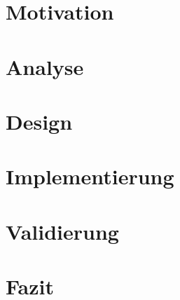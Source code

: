 \documentclass[oneside,bibliography=totoc,openany,numbers=noenddot]{scrbook}
\begin{document}




\startcontents
\chapter{Motivation}
\label{chapter:Motivation}
\thispagestyle{fancy}
 
\stopcontents

\startcontents
\chapter{Analyse}
\label{chapter:Analyse}
\thispagestyle{fancy}

\stopcontents

\startcontents
\chapter{Design}
\label{chapter:Design}
\thispagestyle{fancy}

\stopcontents

\startcontents
\chapter{Implementierung}
\label{chapter:Implementierung}
\thispagestyle{fancy}

\stopcontents

\startcontents
\chapter{Validierung}
\label{chapter:Validierung}
\thispagestyle{fancy}

\stopcontents

\startcontents
\chapter{Fazit}
\label{chapter:Ausblick}
\thispagestyle{fancy}

\stopcontents


\printbibliography{\protect\thispagestyle{fancy}}

\appendix

\end{document}
